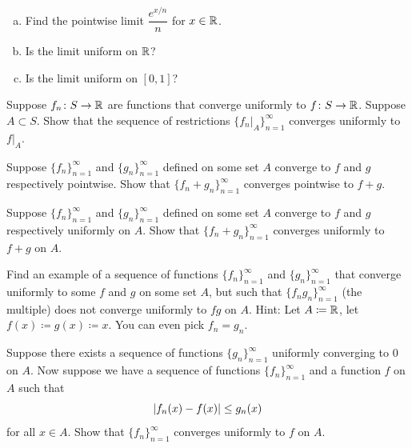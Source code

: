 \begin{exercise}
\leavevmode
\begin{enumerate}[a)]
\item
Find the pointwise limit $\dfrac{e^{x/n}}{n}$ for $x \in {\mathbb{R}}$.
\item
Is the limit uniform on ${\mathbb{R}}$?
\item
Is the limit uniform on $[0,1]$?
\end{enumerate}
\end{exercise}

\begin{exercise}
Suppose $f_n \colon S \to {\mathbb{R}}$ are functions that converge uniformly
to $f \colon S \to {\mathbb{R}}$.  Suppose $A \subset S$.  Show that
the sequence of restrictions $\{ f_n|_A \}_{n=1}^\infty$ converges uniformly to $f|_A$.
\end{exercise}

\begin{exercise}
Suppose $\{ f_n \}_{n=1}^\infty$ and $\{ g_n \}_{n=1}^\infty$ defined on some set $A$ converge to
$f$ and $g$ respectively pointwise.  Show that $\{ f_n+g_n \}_{n=1}^\infty$ converges
pointwise to $f+g$.
\end{exercise}

\begin{exercise}
Suppose $\{ f_n \}_{n=1}^\infty$ and $\{ g_n \}_{n=1}^\infty$ defined on some set $A$ converge to
$f$ and $g$ respectively uniformly on $A$.
Show that $\{ f_n+g_n \}_{n=1}^\infty$
converges uniformly to $f+g$ on $A$.
\end{exercise}

\begin{exercise}
Find an example of a sequence of functions $\{ f_n \}_{n=1}^\infty$ and $\{
g_n \}_{n=1}^\infty$
that converge uniformly to some $f$ and $g$ on some set $A$, but such that
$\{ f_ng_n \}_{n=1}^\infty$ (the multiple) does not converge uniformly to $fg$ on $A$.
Hint: Let $A \coloneqq {\mathbb{R}}$, let $f(x)\coloneqq g(x) \coloneqq x$.  You can even pick $f_n = g_n$.
\end{exercise}

\begin{exercise}
Suppose there exists a sequence of functions $\{ g_n \}_{n=1}^\infty$ uniformly
converging to $0$ on $A$.  Now suppose we have a sequence of functions
$\{ f_n \}_{n=1}^\infty$ and a function $f$ on $A$ such that
\begin{equation*}
\left\lvert {f_n(x) - f(x)} \right\rvert \leq g_n(x) 
\end{equation*}
for all $x \in A$.  Show that $\{ f_n \}_{n=1}^\infty$ converges uniformly to $f$ on $A$.
\end{exercise}

